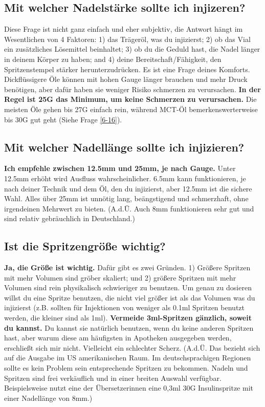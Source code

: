 \documentclass{article}
\begin{document}
\subsection{Mit welcher Nadelstärke sollte ich injizeren?}\label{5-16}

Diese Frage ist nicht ganz einfach und eher subjektiv, die Antwort hängt im Wesentlichen von 4 Faktoren: 1) das Trägeröl, was du injizierst; 2) ob das Vial ein zusätzliches Lösemittel beinhaltet; 3) ob du die Geduld hast, die Nadel länger in deinem Körper zu haben; and 4) deine Bereitschaft/Fähigkeit, den Spritzenstempel stärker herunterzudrücken. Es ist eine Frage deines Komforts. Dickflüssigere Öle können mit hohen Gauge länger brauchen und mehr Druck benötigen, aber dafür haben sie weniger Risiko schmerzen zu verursachen. \textbf{In der Regel ist 25G das Minimum, um keine Schmerzen zu verursachen. }Die meisten Öle gehen bis 27G einfach rein, während MCT-Öl bemerkenswerterweise bis 30G gut geht (Siehe Frage \ref{6-16}).

\subsection{Mit welcher Nadellänge sollte ich injizieren?}

\textbf{Ich empfehle zwischen 12.5mm und 25mm, je nach Gauge.} Unter 12.5mm erhöht wird Ausfluss wahrscheinlicher. 6.5mm kann funktionieren, je nach deiner Technik und dem Öl, den du injizierst, aber 12.5mm ist die sichere Wahl. Alles über 25mm ist unnötig lang, beängstigend und schmerzhaft, ohne irgendeinen Mehrwert zu bieten. (A.d.Ü. Auch 8mm funktionieren sehr gut und sind relativ gebräuchlich in Deutschland.)

\subsection{Ist die Spritzengröße wichtig?}

\textbf{Ja, die Größe ist wichtig.} Dafür gibt es zwei Gründen. 1) Größere Spritzen mit mehr Volumen sind gröber skaliert; und 2) größere Spritzen mit mehr Volumen sind rein physikalisch schwieriger zu benutzen. Um genau zu dosieren willst du eine Spritze benutzen, die nicht viel größer ist als das Volumen was du injizierst (z.B. sollten für Injektionen von weniger als 0.1ml Spritzen benutzt werden, die kleiner sind als 1ml). \textbf{Vermeide 3ml-Spritzen gänzlich, soweit du kannst.} Du kannst sie natürlich benutzen, wenn du keine anderen Spritzen hast, aber warum diese am häufigsten in Apotheken ausgegeben werden, erschließt sich mir nicht. Vielleicht ein schlechter Scherz. (A.d.Ü. Das bezieht sich auf die Ausgabe im US amerikanischen Raum. Im deutschsprachigen Regionen sollte es kein Problem sein entsprechende Spritzen zu bekommen. Nadeln und Spritzen sind frei verkäuflich und in einer breiten Auswahl verfügbar. Beispielsweise nutzt eine der Übersetzerinnen eine 0,3ml 30G Insulinspritze mit einer Nadellänge von 8mm.)
\end{document}
